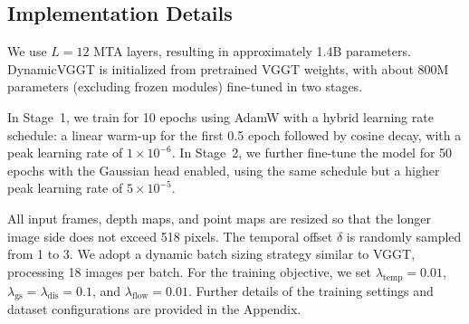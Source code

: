 \subsection{Implementation Details}


We use $L=12$ MTA layers, resulting in approximately 1.4B parameters. 
DynamicVGGT is initialized from pretrained VGGT weights, with about 800M parameters (excluding frozen modules) fine-tuned in two stages.

In Stage~1, we train for 10 epochs using AdamW with a hybrid learning rate schedule: a linear warm-up for the first 0.5 epoch followed by cosine decay, with a peak learning rate of $1\times10^{-6}$. 
In Stage~2, we further fine-tune the model for 50 epochs with the Gaussian head enabled, using the same schedule but a higher peak learning rate of $5\times10^{-5}$.

All input frames, depth maps, and point maps are resized so that the longer image side does not exceed 518 pixels. 
The temporal offset $\delta$ is randomly sampled from 1 to 3. 
We adopt a dynamic batch sizing strategy similar to VGGT, processing 18 images per batch.
For the training objective, we set 
$\lambda_{\mathrm{temp}} = 0.01$, 
$\lambda_{\mathrm{gs}} = \lambda_{\mathrm{dis}} = 0.1$, 
and $\lambda_{\mathrm{flow}} = 0.01$. Further details of the training settings and dataset configurations are provided in the Appendix.

